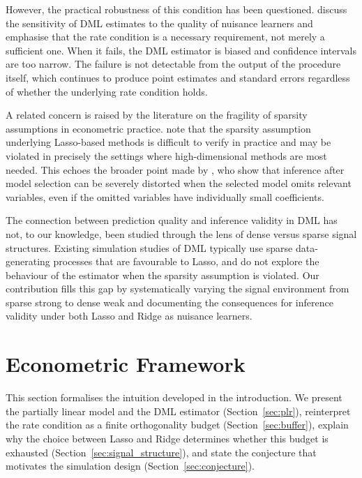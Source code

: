 \documentclass[a4paper,10.5pt]{article}
\begin{document}
However, the practical robustness of this condition has been questioned. \citet{chernozhukov2022} discuss the sensitivity of DML estimates to the quality of nuisance learners and emphasise that the rate condition is a necessary requirement, not merely a sufficient one. When it fails, the DML estimator is biased and confidence intervals are too narrow. The failure is not detectable from the output of the procedure itself, which continues to produce point estimates and standard errors regardless of whether the underlying rate condition holds.

A related concern is raised by the literature on the fragility of sparsity assumptions in econometric practice. \citet{giannone2021} note that the sparsity assumption underlying Lasso-based methods is difficult to verify in practice and may be violated in precisely the settings where high-dimensional methods are most needed. This echoes the broader point made by \citet{leeb2005}, who show that inference after model selection can be severely distorted when the selected model omits relevant variables, even if the omitted variables have individually small coefficients.

The connection between prediction quality and inference validity in DML has not, to our knowledge, been studied through the lens of dense versus sparse signal structures. Existing simulation studies of DML \citep{bach2022, chernozhukov2018} typically use sparse data-generating processes that are favourable to Lasso, and do not explore the behaviour of the estimator when the sparsity assumption is violated. Our contribution fills this gap by systematically varying the signal environment from sparse strong to dense weak and documenting the consequences for inference validity under both Lasso and Ridge as nuisance learners.


\section{Econometric Framework}\label{sec:framework}

This section formalises the intuition developed in the introduction. We present the partially linear model and the DML estimator (Section~\ref{sec:plr}), reinterpret the rate condition as a finite orthogonality budget (Section~\ref{sec:buffer}), explain why the choice between Lasso and Ridge determines whether this budget is exhausted (Section~\ref{sec:signal_structure}), and state the conjecture that motivates the simulation design (Section~\ref{sec:conjecture}).
\end{document}
